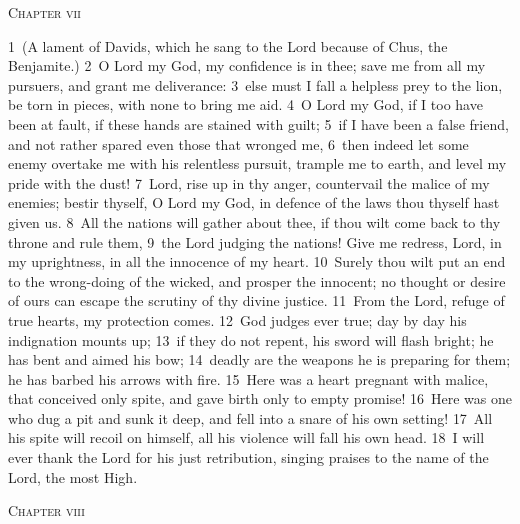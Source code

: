 \documentclass[10pt]{book} %
\begin{document}
\begin{large}\begin{center}\textsc{Chapter vii}\end{center}\end{large}
\textcolor{benred8}{1}~(A lament of David\textquotesingle s, which he sang to the Lord because of Chus, the Benjamite.)
\textcolor{benred8}{2}~O Lord my God, my confidence is in thee; save me from all my pursuers, and grant me deliverance: \textcolor{benred8}{3}~else must I fall a helpless prey to the lion, be torn in pieces, with none to bring me aid. \textcolor{benred8}{4}~O Lord my God, if I too have been at fault, if these hands are stained with guilt; \textcolor{benred8}{5}~if I have been a false friend, and not rather spared even those that wronged me, \textcolor{benred8}{6}~then indeed let some enemy overtake me with his relentless pursuit, trample me to earth, and level my pride with the dust! \textcolor{benred8}{7}~Lord, rise up in thy anger, countervail the malice of my enemies; bestir thyself, O Lord my God, in defence of the laws thou thyself hast given us. \textcolor{benred8}{8}~All the nations will gather about thee, if thou wilt come back to thy throne and rule them, \textcolor{benred8}{9}~the Lord judging the nations! Give me redress, Lord, in my uprightness, in all the innocence of my heart. \textcolor{benred8}{10}~Surely thou wilt put an end to the wrong-doing of the wicked, and prosper the innocent; no thought or desire of ours can escape the scrutiny of thy divine justice. \textcolor{benred8}{11}~From the Lord, refuge of true hearts, my protection comes. \textcolor{benred8}{12}~God judges ever true; day by day his indignation mounts up; \textcolor{benred8}{13}~if they do not repent, his sword will flash bright; he has bent and aimed his bow; \textcolor{benred8}{14}~deadly are the weapons he is preparing for them; he has barbed his arrows with fire. \textcolor{benred8}{15}~Here was a heart pregnant with malice, that conceived only spite, and gave birth only to empty promise! \textcolor{benred8}{16}~Here was one who dug a pit and sunk it deep, and fell into a snare of his own setting! \textcolor{benred8}{17}~All his spite will recoil on himself, all his violence will fall his own head. \textcolor{benred8}{18}~I will ever thank the Lord for his just retribution, singing praises to the name of the Lord, the most High.
\begin{large}\begin{center}\textsc{Chapter viii}\end{center}\end{large}
\end{document}
